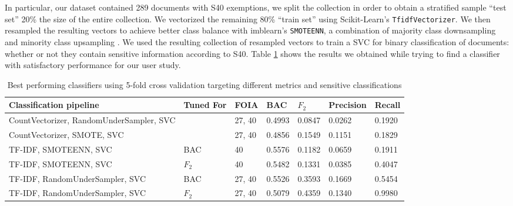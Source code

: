 \documentclass[\version]{l4proj}
\begin{document}
In particular, our dataset contained 289 documents with S40 exemptions, we split the collection in order to obtain a stratified sample ``test set'' 20\% the size of the entire collection.
We vectorized the remaining 80\% ``train set'' using Scikit-Learn's \verb|TfidfVectorizer|.
We then resampled the resulting vectors to achieve better class balance with imblearn's \verb|SMOTEENN|, a combination of majority class downsampling and minority class upsampling \autocite{lemaitreImbalancedlearnPythonToolbox2017}.
We used the resulting collection of resampled vectors to train a SVC for binary classification of documents: whether or not they contain sensitive information according to S40.
Table \ref{tab:clf_perf} shows the results we obtained while trying to find a classifier with satisfactory performance for our user study.

\begin{table}[H]
    \begin{adjustbox}{width=\textwidth,center}
        \begin{tabular}{l|llllll}
            Classification pipeline                  & Tuned For & FOIA   & BAC    & \(F_{2}\) & Precision & Recall \\ \hline
            CountVectorizer, RandomUnderSampler, SVC &           & 27, 40 & 0.4993 & 0.0847    & 0.0262    & 0.1920 \\
            CountVectorizer, SMOTE, SVC              &           & 27, 40 & 0.4856 & 0.1549    & 0.1151    & 0.1829 \\
            TF-IDF, SMOTEENN, SVC                    & BAC       & 40     & 0.5576 & 0.1182    & 0.0659    & 0.1911 \\
            TF-IDF, SMOTEENN, SVC                    & \(F_{2}\) & 40     & 0.5482 & 0.1331    & 0.0385    & 0.4047 \\
            TF-IDF, RandomUnderSampler, SVC          & BAC       & 27, 40 & 0.5526 & 0.3593    & 0.1669    & 0.5454 \\
            TF-IDF, RandomUnderSampler, SVC          & \(F_{2}\) & 27, 40 & 0.5079 & 0.4359    & 0.1340    & 0.9980 \\
        \end{tabular}
    \end{adjustbox}
    \caption{Best performing classifiers using 5-fold cross validation targeting different metrics and sensitive classifications}\label{tab:clf_perf}
    \vspace{-10pt}
\end{table}
\end{document}
